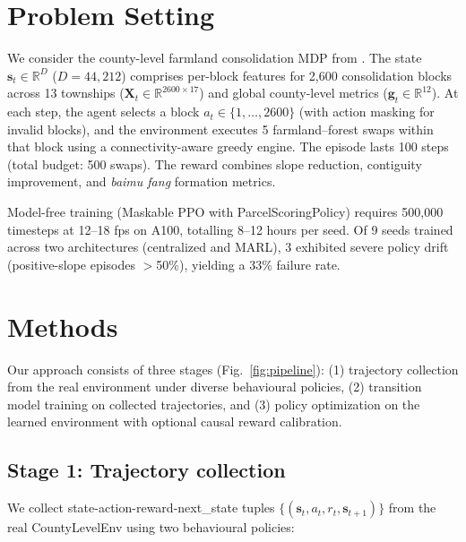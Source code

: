 \documentclass[11pt]{article}
\begin{document}
\section{Problem Setting}
\label{sec:problem}

We consider the county-level farmland consolidation MDP from \citet{zhou2026county}. The state $\mathbf{s}_t \in \mathbb{R}^{D}$ ($D = 44{,}212$) comprises per-block features for 2{,}600 consolidation blocks across 13 townships ($\mathbf{X}_t \in \mathbb{R}^{2600 \times 17}$) and global county-level metrics ($\mathbf{g}_t \in \mathbb{R}^{12}$). At each step, the agent selects a block $a_t \in \{1, \ldots, 2600\}$ (with action masking for invalid blocks), and the environment executes 5 farmland--forest swaps within that block using a connectivity-aware greedy engine. The episode lasts 100 steps (total budget: 500 swaps). The reward combines slope reduction, contiguity improvement, and \textit{baimu fang} formation metrics.

Model-free training (Maskable PPO with ParcelScoringPolicy) requires 500{,}000 timesteps at 12--18 fps on A100, totalling 8--12 hours per seed. Of 9 seeds trained across two architectures (centralized and MARL), 3 exhibited severe policy drift (positive-slope episodes $>$50\%), yielding a 33\% failure rate.


\section{Methods}
\label{sec:methods}

Our approach consists of three stages (Fig.~\ref{fig:pipeline}): (1) trajectory collection from the real environment under diverse behavioural policies, (2) transition model training on collected trajectories, and (3) policy optimization on the learned environment with optional causal reward calibration.

\subsection{Stage 1: Trajectory collection}

We collect state-action-reward-next\_state tuples $\{(\mathbf{s}_t, a_t, r_t, \mathbf{s}_{t+1})\}$ from the real CountyLevelEnv using two behavioural policies:
\end{document}
